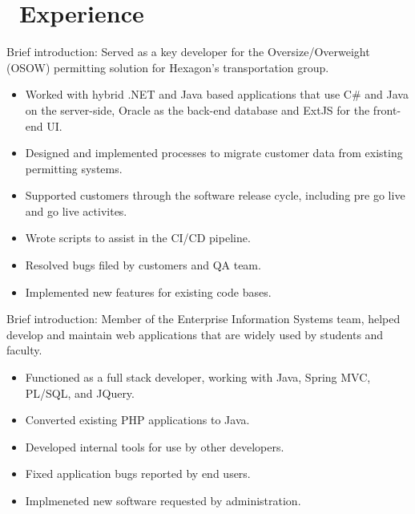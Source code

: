 \documentclass{resume}
\begin{document}



\section{\faUsers\ Experience}
\role{Software Analyst}

Brief introduction: Served as a key developer for the Oversize/Overweight (OSOW) permitting solution for Hexagon's transportation group.
\begin{itemize}
  \item Worked with hybrid .NET and Java based applications that use C\# and Java on the server-side, Oracle as the back-end database and ExtJS for the front-end UI.
  \item Designed and implemented processes to migrate customer data from existing permitting systems.
  \item Supported customers through the software release cycle, including pre go live and go live activites.
  \item Wrote scripts to assist in the CI/CD pipeline.
  \item Resolved bugs filed by customers and QA team.
  \item Implemented new features for existing code bases.
\end{itemize}


Brief introduction: Member of the Enterprise Information Systems team, helped develop and maintain web applications that are widely used by students and faculty.
\begin{itemize}
  \item Functioned as a full stack developer, working with Java, Spring MVC, PL/SQL, and JQuery.
  \item Converted existing PHP applications to Java.
  \item Developed internal tools for use by other developers.
  \item Fixed application bugs reported by end users.
  \item Implmeneted new software requested by administration.
\end{itemize}
\end{document}
